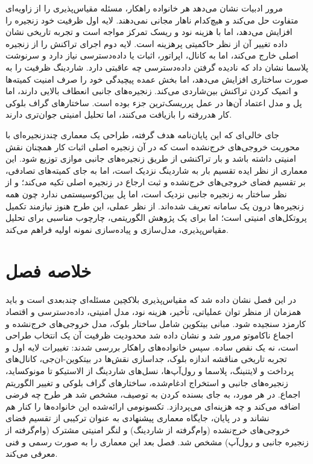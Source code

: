 مرور ادبیات نشان می‌دهد هر خانواده راهکار، مسئله مقیاس‌پذیری را از زاویه‌ای متفاوت حل می‌کند و هیچ‌کدام ناهار مجانی نمی‌دهند. لایه اول ظرفیت خود زنجیره را افزایش می‌دهد، اما با هزینه نود و ریسک تمرکز مواجه است و تجربه تاریخی نشان داده تغییر آن از نظر حاکمیتی پرهزینه است. لایه دوم اجرای تراکنش را از زنجیره اصلی خارج می‌کند، اما به کانال، اپراتور، اثبات یا داده‌دسترسی نیاز دارد و سرنوشت پلاسما نشان داد که نادیده گرفتن داده‌دسترسی چه عاقبتی دارد. شاردینگ ظرفیت را به صورت ساختاری افزایش می‌دهد، اما بخش عمده پیچیدگی خود را صرف امنیت کمیته‌ها و اتمیک کردن تراکنش بین‌شاردی می‌کند. زنجیره‌های جانبی انعطاف بالایی دارند، اما پل و مدل اعتماد آن‌ها در عمل پرریسک‌ترین جزء بوده است. ساختارهای گراف بلوکی کار هدررفته را بازیافت می‌کنند، اما تحلیل امنیتی جوان‌تری دارند.

جای خالی‌ای که این پایان‌نامه هدف گرفته، طراحی یک معماری چندزنجیره‌ای با محوریت خروجی‌های خرج‌نشده است که در آن زنجیره اصلی اثبات کار همچنان نقش امنیتی داشته باشد و بار تراکنشی از طریق زنجیره‌های جانبی موازی توزیع شود. این معماری از نظر ایده تقسیم بار به شاردینگ نزدیک است، اما به جای کمیته‌های تصادفی، بر تقسیم فضای خروجی‌های خرج‌نشده و ثبت ارجاع در زنجیره اصلی تکیه می‌کند؛ و از نظر ساختار به زنجیره جانبی نزدیک است، اما پل بین‌اکوسیستمی ندارد چون همه زنجیره‌ها درون یک سامانه تعریف شده‌اند. از نظر عملی، این طرح هنوز نیازمند تکمیل پروتکل‌های امنیتی است؛ اما برای یک پژوهش الگوریتمی، چارچوب مناسبی برای تحلیل مقیاس‌پذیری، مدل‌سازی و پیاده‌سازی نمونه اولیه فراهم می‌کند.

\section{خلاصه فصل}

در این فصل نشان داده شد که مقیاس‌پذیری بلاکچین مسئله‌ای چندبعدی است و باید همزمان از منظر توان عملیاتی، تأخیر، هزینه نود، مدل امنیتی، داده‌دسترسی و اقتصاد کارمزد سنجیده شود. مبانی بیتکوین شامل ساختار بلوک، مدل خروجی‌های خرج‌نشده و اجماع ناکاموتو مرور شد و نشان داده شد محدودیت ظرفیت آن یک انتخاب طراحی است، نه یک نقص ساده. سپس خانواده‌های راهکار بررسی شدند: تغییرات لایه اول و تجربه تاریخی مناقشه اندازه بلوک، جداسازی نقش‌ها در بیتکوین-ان‌جی، کانال‌های پرداخت و لایتنینگ، پلاسما و رول‌آپ‌ها، نسل‌های شاردینگ از الاستیکو تا مونوکساید، زنجیره‌های جانبی و استخراج ادغام‌شده، ساختارهای گراف بلوکی و تغییر الگوریتم اجماع. در هر مورد، به جای بسنده کردن به توصیف، مشخص شد هر طرح چه فرضی اضافه می‌کند و چه هزینه‌ای می‌پردازد. تکسونومی ارائه‌شده این خانواده‌ها را کنار هم نشاند و در پایان، جایگاه معماری پیشنهادی به عنوان ترکیبی از تقسیم فضای خروجی‌های خرج‌نشده (وام‌گرفته از شاردینگ) و لنگر امنیتی مشترک (وام‌گرفته از زنجیره جانبی و رول‌آپ) مشخص شد. فصل بعد این معماری را به صورت رسمی و فنی معرفی می‌کند.
